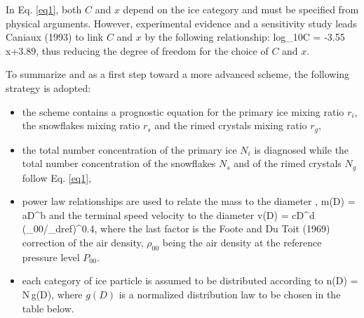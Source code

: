 In Eq. \ref{eq1}, both $C$ and $x$ depend on the ice category
and must be specified from physical arguments. However, experimental evidence
and a sensitivity study leads Caniaux (1993) to link $C$ and $x$ by the
following relationship:
%
\be\label{eq2}
log_{10}C = -3.55\,x+3.89,
\ee
%
\noindent thus reducing the degree of freedom for the choice of $C$ and $x$.

\medskip
\medskip
\noindent To summarize and as a first step toward a more advanced scheme, the
following strategy is adopted:
\begin{itemize}
\item the scheme contains a prognostic equation for the primary ice mixing ratio
$r_i$, the snowflakes mixing ratio $r_s$ and the rimed crystals mixing ratio
$r_g$,
\item the total number concentration of the primary ice $N_i$ is diagnosed
while the total number concentration of the snowflakes $N_s$ and of the rimed
crystals $N_g$ follow Eq. \ref{eq1},
\item power law relationships are used to relate the mass to the diameter\footnotemark
%
,
%
\be\label{eq3}
m(D) = aD^b
\ee
%
\noindent and the terminal speed velocity to the diameter
%
\be\label{eq4}
v(D) = cD^d \, (\rho_{00}/\rho_{dref})^{0.4},
\ee
%
\noindent where the last factor is the Foote and Du Toit (1969) correction of
the air density, $\rho_{00}$ being the air density at the reference pressure
level $P_{00}$.
\item each category of ice particle is assumed to be distributed according to
%
\be\label{eq5}
n(D) = N\,g(D),
\ee
%
\noindent where $g(D)$ is a normalized distribution law to be chosen in the
table below.


\end{itemize}
